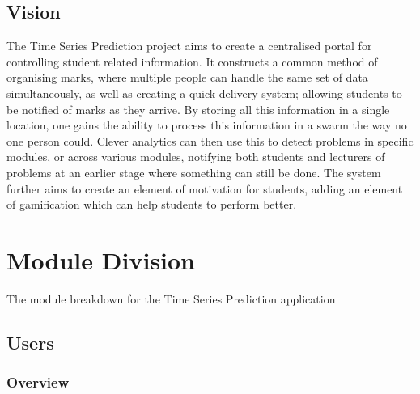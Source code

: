 \documentclass[12pt]{article}
\begin{document}
	\subsection{Vision}
	The Time Series Prediction project aims to create a centralised portal for controlling student related information. It constructs a common method of organising marks, where multiple people can handle the same set of data simultaneously, as well as creating a quick delivery system; allowing students to be notified of marks as they arrive. By storing all this information in a single location, one gains the ability to process this information in a swarm the way no one person could. Clever analytics can then use this to detect problems in specific modules, or across various modules, notifying both students and lecturers of problems at an earlier stage where something can still be done. The system further aims to create an element of motivation for students, adding an element of gamification which can help students to perform better.

\pagebreak

\section{Module Division}

	The module breakdown for the Time Series Prediction application
	
	\subsection{Users}
	
		\subsubsection{Overview}
		
\end{document}
